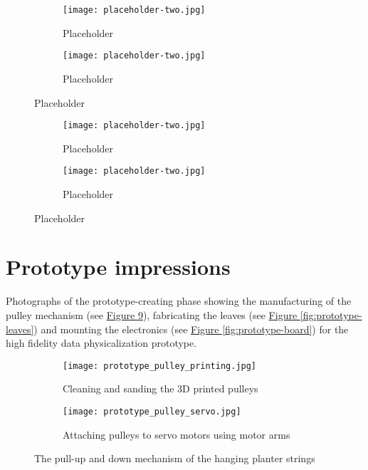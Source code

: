 \begin{appendices}
\begin{figure}[htbp]
    \centering
    \begin{subfigure}{0.48\textwidth}
        \centering
        \texttt{[image: placeholder-two.jpg]}
        \caption{Placeholder}
        \label{fig:image1}
    \end{subfigure}
    \hfill
    \begin{subfigure}{0.48\textwidth}
        \centering
        \texttt{[image: placeholder-two.jpg]}
        \caption{Placeholder}
        \label{fig:image2}
    \end{subfigure}
    \caption{Placeholder}
    \label{fig:grid}
\end{figure}

\begin{figure}[htbp]
    \centering
    \begin{subfigure}{0.48\textwidth}
        \centering
        \texttt{[image: placeholder-two.jpg]}
        \caption{Placeholder}
        \label{fig:image1}
    \end{subfigure}
    \hfill
    \begin{subfigure}{0.48\textwidth}
        \centering
        \texttt{[image: placeholder-two.jpg]}
        \caption{Placeholder}
        \label{fig:image2}
    \end{subfigure}
    \caption{Placeholder}
    \label{fig:grid}
\end{figure}

\section{Prototype impressions}
\label{appendix:prototype}

Photographs of the prototype-creating phase showing the manufacturing of the pulley mechanism (see \hyperref[fig:prototype-pulley]{Figure \ref{fig:prototype-pulley}}), fabricating the leaves (see \hyperref[fig:prototype-leaves]{Figure \ref{fig:prototype-leaves}}) and mounting the electronics (see \hyperref[fig:prototype-board]{Figure \ref{fig:prototype-board}}) for the high fidelity data physicalization prototype.

\begin{figure}[htbp]
    \centering
    \begin{subfigure}{0.48\textwidth}
        \centering
        \texttt{[image: prototype\_pulley\_printing.jpg]}
        \caption{Cleaning and sanding the 3D printed pulleys}
        \label{fig:pulley-sanding}
    \end{subfigure}
    \hfill
    \begin{subfigure}{0.48\textwidth}
        \centering
        \texttt{[image: prototype\_pulley\_servo.jpg]}
        \caption{Attaching pulleys to servo motors using motor arms}
        \label{fig:pulley-servo}
    \end{subfigure}
    \caption{The pull-up and down mechanism of the hanging planter strings}
    \label{fig:prototype-pulley}
\end{figure}


\end{appendices}
